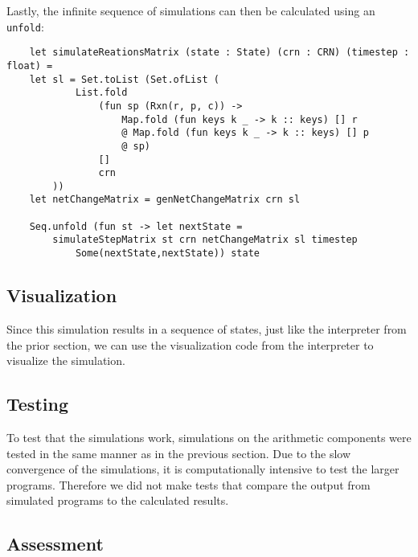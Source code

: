 Lastly, the infinite sequence of simulations can then be calculated using an \texttt{unfold}:
\begin{verbatim}
    let simulateReationsMatrix (state : State) (crn : CRN) (timestep : float) = 
    let sl = Set.toList (Set.ofList (
            List.fold
                (fun sp (Rxn(r, p, c)) ->
                    Map.fold (fun keys k _ -> k :: keys) [] r
                    @ Map.fold (fun keys k _ -> k :: keys) [] p
                    @ sp)
                []
                crn
        ))
    let netChangeMatrix = genNetChangeMatrix crn sl

    Seq.unfold (fun st -> let nextState = 
        simulateStepMatrix st crn netChangeMatrix sl timestep
            Some(nextState,nextState)) state

\end{verbatim}

\subsection{Visualization}
Since this simulation results in a sequence of states, just like the interpreter from the prior section, we can use the visualization code from the interpreter to visualize the simulation.

\subsection{Testing}
To test that the simulations work, simulations on the arithmetic components were tested in the same manner as in the previous section. Due to the slow convergence of the simulations, it is computationally intensive to test the larger programs. Therefore we did not make tests that compare the output from simulated programs to the calculated results. 

\subsection{Assessment}